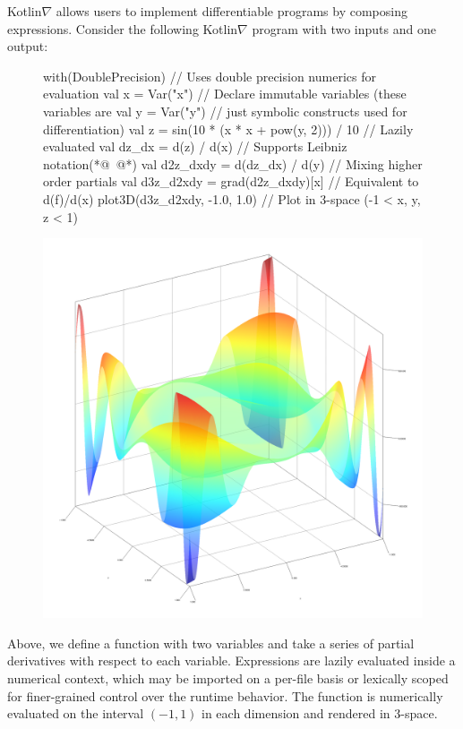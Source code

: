 Kotlin$\nabla$ allows users to implement differentiable programs by composing expressions. Consider the following Kotlin$\nabla$ program with two inputs and one output:
%
\begin{figure}[H] \label{fig:basic_kotlingrad}
\begin{unbreakablekotlin}
with(DoublePrecision) { // Uses double precision numerics for evaluation
  val x = Var("x") // Declare immutable variables (these variables are
  val y = Var("y") // just symbolic constructs used for differentiation)
  val z = sin(10 * (x * x + pow(y, 2))) / 10 // Lazily evaluated
  val dz_dx = d(z) / d(x) // Supports Leibniz notation(*@~\citep{christianson2012leibniz}@*)
  val d2z_dxdy = d(dz_dx) / d(y) // Mixing higher order partials
  val d3z_d2xdy = grad(d2z_dxdy)[x] // Equivalent to d(f)/d(x)
  plot3D(d3z_d2xdy, -1.0, 1.0) // Plot in 3-space (-1 < x, y, z < 1)
}
\end{unbreakablekotlin}
\includegraphics[scale=0.43]{../figures/plot_result.png}
\end{figure}
%
Above, we define a function with two variables and take a series of partial derivatives with respect to each variable. Expressions are lazily evaluated inside a numerical context, which may be imported on a per-file basis or lexically scoped for finer-grained control over the runtime behavior. The function is numerically evaluated on the interval $(-1, 1)$ in each dimension and rendered in 3-space.
